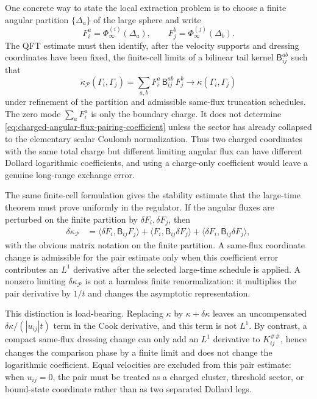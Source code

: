 One concrete way to state the local extraction problem is to choose a finite
angular partition \(\{\Delta_a\}\) of the large sphere and write
\[
  F_i^a=\Phi_\infty^{(i)}(\Delta_a),\qquad
  F_j^b=\Phi_\infty^{(j)}(\Delta_b).
\]
The QFT estimate must then identify, after the velocity supports and dressing
coordinates have been fixed, the finite-cell limits of a bilinear tail kernel
\(\mathsf B_{ij}^{ab}\) such that
\begin{equation}
  \kappa_{\mathcal P}(\Gamma_i,\Gamma_j)
  =
  \sum_{a,b}F_i^a\,\mathsf B_{ij}^{ab}\,F_j^b
  \longrightarrow
  \kappa(\Gamma_i,\Gamma_j)
  \label{eq:charged-angular-flux-pairing-coefficient}
\end{equation}
under refinement of the partition and admissible same-flux truncation
schedules.  The zero mode
\(\sum_a F_i^a\) is only the boundary charge.  It does not determine
\eqref{eq:charged-angular-flux-pairing-coefficient} unless the sector has
already collapsed to the elementary scalar Coulomb normalization.  Thus two
charged coordinates with the same total charge but different limiting
angular flux can have different Dollard logarithmic coefficients, and using a
charge-only coefficient would leave a genuine long-range exchange error.

The same finite-cell formulation gives the stability estimate that the
large-time theorem must prove uniformly in the regulator.  If the angular
fluxes are perturbed on the finite partition by
\(\delta F_i,\delta F_j\), then
\begin{align}
  \delta\kappa_{\mathcal P}
  &=
  \langle \delta F_i,\mathsf B_{ij}F_j\rangle
  +
  \langle F_i,\mathsf B_{ij}\delta F_j\rangle
  +
  \langle \delta F_i,\mathsf B_{ij}\delta F_j\rangle ,
  \label{eq:charged-flux-pairing-coefficient-stability}
\end{align}
with the obvious matrix notation on the finite partition.  A same-flux
coordinate change is admissible for the pair estimate only when this
coefficient error contributes an \(L^1\) derivative after the selected
large-time schedule is applied.  A nonzero limiting
\(\delta\kappa_{\mathcal P}\) is not a harmless finite renormalization: it
multiplies the pair derivative by \(1/t\) and changes the asymptotic
representation.

This distinction is load-bearing.  Replacing \(\kappa\) by
\(\kappa+\delta\kappa\) leaves an uncompensated
\(\delta\kappa/(|u_{ij}|t)\) term in the Cook derivative, and this term is
not \(L^1\).  By contrast, a compact same-flux dressing change can only add
an \(L^1\) derivative to \(K_{ij}^{\#\#}\), hence changes the comparison phase
by a finite limit and does not change the logarithmic coefficient.  Equal
velocities are excluded from this pair estimate: when \(u_{ij}=0\), the pair
must be treated as a charged cluster, threshold sector, or bound-state
coordinate rather than as two separated Dollard legs.

